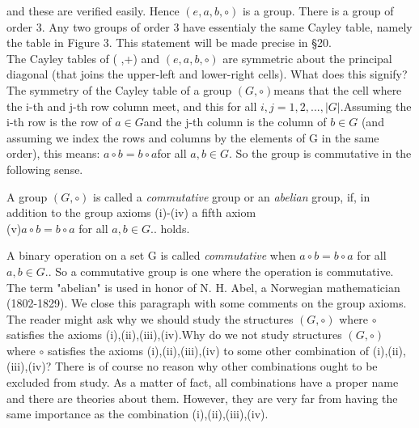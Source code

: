 \documentclass{article}
\begin{document}
and these are verified easily. Hence
$ ({e,a,b }, \circ)$ is a group. There is a group of order 3. Any two groups of order 3 have essentialy the same Cayley table, namely the table in Figure 3. This statement will be made precise in §20.\\	

The Cayley tables of ( \hSoN ,+) and $({e,a,b}, \circ)$ are symmetric about the principal diagonal (that joins the upper-left and lower-right cells). What does this signify? The symmetry of the Cayley table of a group
$ (G, \circ)$means that the cell where the i-th and j-th row column meet, and this for all
$ i,j =1,2,...,|G|.$Assuming the i-th row is the row of $a \in G $and the j-th column is the column of $ b \in G$
(and assuming we index the rows and columns by the elements of G in the same order), this means:
$ a \circ b = b \circ a$for all  $a,b \in G. $
So the group is commutative in the following sense.
\begin{defn}
	A group 
	$(G, \circ)
	$ is called a \textit{commutative} group or an \textit{abelian} group, if, in addition to the group axioms 
	(i)-(iv) a fifth axiom \\
		(v)$ a \circ b = b \circ a
$
for all 
$a,b \in G.
$.
	holds.
\end{defn}
A binary operation on a set G is called \textit{commutative} when 
$ a \circ b = b \circ a
$
for all 
$a,b \in G.
$.
So a commutative group is one where the operation is commutative. The term "abelian" is used in honor of N. H. Abel, a Norwegian mathematician (1802-1829).
We close this paragraph with some comments on the group axioms. The reader might ask why we should study the structures 
$(G,\circ)$ where $\circ$ satisfies the axioms (i),(ii),(iii),(iv).Why do we not study structures $(G,\circ)$
where $\circ$ satisfies the axioms (i),(ii),(iii),(iv) to some other combination of (i),(ii),(iii),(iv)? There is of course no reason why other combinations ought to be excluded from study. As a matter of fact, all combinations have a proper name and there are theories about them. However, they are very far from having the same importance as the combination (i),(ii),(iii),(iv). 
\end{document}
